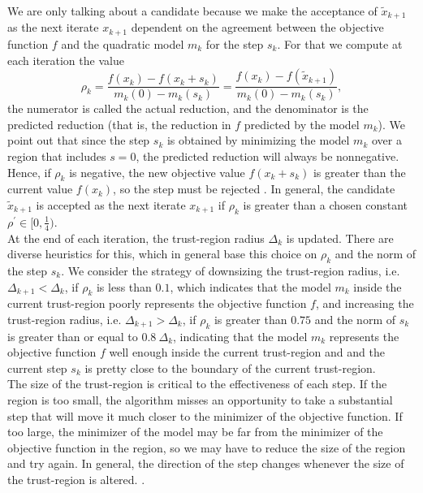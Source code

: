 We are only talking about a candidate because we make the acceptance of $\widetilde{x}_{k+1}$ as the next iterate $x_{k+1}$ dependent on the agreement between the objective function $f$ and the quadratic model $m_k$ for the step $s_k$. For that we compute at each iteration the value
\begin{equation}\label{agreement}
    \rho_k = \frac{f(x_k) - f(x_k + s_k)}{m_k(0) - m_k(s_k)} = \frac{f(x_k) - f(\widetilde{x}_{k+1})}{m_k(0) - m_k(s_k)},
\end{equation}
the numerator is called the actual reduction, and the denominator is the predicted reduction (that is, the reduction in $f$ predicted by the model $m_k$). We point out that since the step $s_k$ is obtained by minimizing the model $m_k$ over a region that includes $s = 0$, the predicted reduction will always be nonnegative. Hence, if $\rho_k$ is negative, the new objective value $f(x_k + s_k)$ is greater than the current value $f(x_k)$, so the step must be rejected \cite[p.~68-69]{NocedalWright:2006}. In general, the candidate $\widetilde{x}_{k+1}$ is accepted as the next iterate $x_{k+1}$ if $\rho_k$ is greater than a chosen constant $\rho^{\prime} \in [0 , \frac{1}{4})$. \\
At the end of each iteration, the trust-region radius $\Delta_k$ is updated. There are diverse heuristics for this, which in general base this choice on $\rho_k$ and the norm of the step $s_k$. We consider the strategy of downsizing the trust-region radius, i.e. $\Delta_{k+1} < \Delta_k$, if $\rho_k$ is less than $0.1$, which indicates that the model $m_k$ inside the current trust-region poorly represents the objective function $f$, and increasing the trust-region radius, i.e. $\Delta_{k+1} > \Delta_k$, if $\rho_k$ is greater than $0.75$ and the norm of $s_k$ is greater than or equal to $0.8 \ \Delta_k$, indicating that the model $m_k$ represents the objective function $f$ well enough inside the current trust-region and and the current step $s_k$ is pretty close to the boundary of the current trust-region. \\
The size of the trust-region is critical to the effectiveness of each step. If the region is too small, the algorithm misses an opportunity to take a substantial step that will move it much closer to the minimizer of the objective function. If too large, the minimizer of the model may be far from the minimizer of the objective function in the region, so we may have to reduce the size of the region and try again. In general, the direction of the step changes whenever the size of the trust-region is altered. \cite[p.~67]{NocedalWright:2006}. \\

